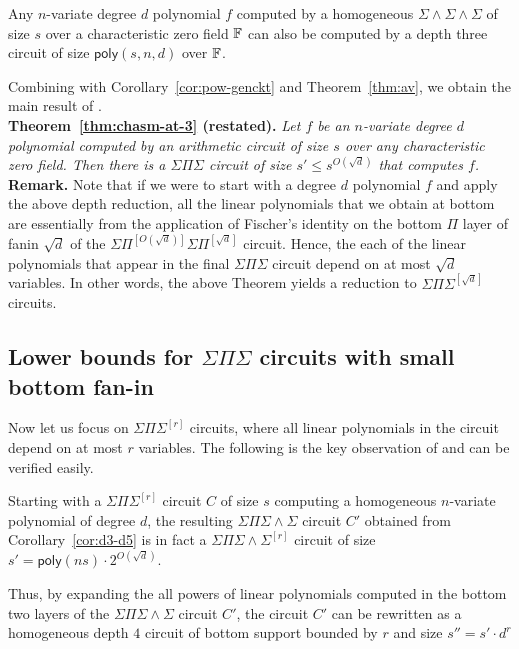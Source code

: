 \documentclass[12pt]{report}
\newcommand{\SPS}{\Sigma\Pi\Sigma}
\newcommand{\SPSPfanin}[2]{\Sigma\Pi^{[#1]}\Sigma\Pi^{[#2]}}
\newcommand{\SESES}{\Sigma\!\wedge\!\Sigma\!\wedge\!\Sigma}
\newcommand{\poly}{\mathsf{poly}}
\begin{document}
\begin{lemma}
Any $n$-variate degree $d$ polynomial $f$ computed by a homogeneous $\SESES$ of size $s$ over a characteristic zero field $\mathbb{F}$ can also be computed by a depth three circuit of size $\poly(s,n,d)$ over $\mathbb{F}$. 
\end{lemma}

Combining with Corollary~\ref{cor:pow-genckt} and Theorem~\ref{thm:av}, we obtain the main result of \cite{gkks13b}. \\

{\bf Theorem~\ref{thm:chasm-at-3} (restated). }{\em 
Let $f$ be an $n$-variate degree $d$ polynomial computed by an arithmetic circuit of size $s$ over any characteristic zero field. Then there is a $\SPS$ circuit of size $s' \leq s^{O(\sqrt{d})}$ that computes $f$. 
}\\

{\bf Remark. } Note that if we were to start with a degree $d$ polynomial $f$ and apply the above depth reduction, all the linear polynomials that we obtain at bottom are essentially from the application of Fischer's identity on the bottom $\Pi$ layer of fanin $\sqrt{d}$ of the $\SPSPfanin{O(\sqrt{d})}{\sqrt{d}}$ circuit. Hence, the each of the linear polynomials that appear in the final $\SPS$ circuit depend on at most $\sqrt{d}$ variables. In other words, the above Theorem yields a reduction to $\SPS^{[\sqrt{d}]}$ circuits. 

\subsection{Lower bounds for $\SPS$ circuits with small bottom fan-in}

Now let us focus on $\SPS^{[r]}$ circuits, where all linear polynomials in the circuit depend on at most $r$ variables. The following is the key observation of \cite{KayalSaha14} and can be verified easily. 

\begin{observation}
Starting with a $\SPS^{[r]}$ circuit $C$ of size $s$ computing a homogeneous $n$-variate polynomial of degree $d$, the resulting $\Sigma\Pi\Sigma\!\wedge\!\Sigma$ circuit $C'$ obtained from Corollary~\ref{cor:d3-d5} is in fact a 
$\Sigma\Pi\Sigma\!\wedge\!\Sigma^{[r]}$ circuit of size $s' = \poly(ns) \cdot 2^{O(\sqrt{d})}$. 

Thus, by expanding the all powers of linear polynomials computed in the bottom two layers of the $\Sigma\Pi\Sigma\!\wedge\!\Sigma$ circuit $C'$, the circuit $C'$ can be rewritten as a homogeneous depth $4$ circuit of bottom support bounded by $r$ and  size $s'' = s' \cdot d^r$
\end{observation}
\end{document}

